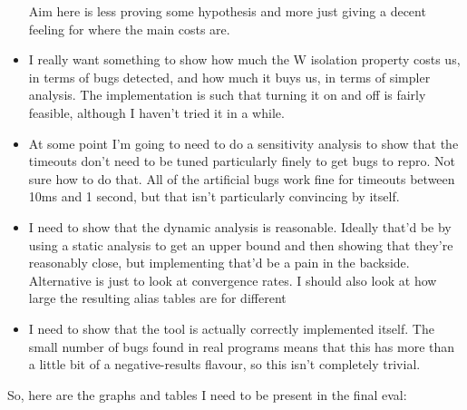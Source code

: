 \begin{itemize}
  Aim here is less proving some hypothesis and more just giving a
  decent feeling for where the main costs are.
\item I really want something to show how much the W isolation
  property costs us, in terms of bugs detected, and how much it buys
  us, in terms of simpler analysis.  The implementation is such that
  turning it on and off is fairly feasible, although I haven't tried
  it in a while.

\item At some point I'm going to need to do a sensitivity analysis to
  show that the timeouts don't need to be tuned particularly finely to
  get bugs to repro.  Not sure how to do that.  All of the artificial
  bugs work fine for timeouts between 10ms and 1 second, but that
  isn't particularly convincing by itself.
\item I need to show that the dynamic analysis is reasonable.
  Ideally that'd be by using a static analysis to get an upper bound
  and then showing that they're reasonably close, but implementing
  that'd be a pain in the backside.  Alternative is just to look at
  convergence rates.  I should also look at how large the resulting
  alias tables are for different
\item I need to show that the tool is actually correctly implemented
  itself.  The small number of bugs found in real programs means that
  this has more than a little bit of a negative-results flavour, so
  this isn't completely trivial.
\end{itemize}

So, here are the graphs and tables I need to be present in the final
eval:

